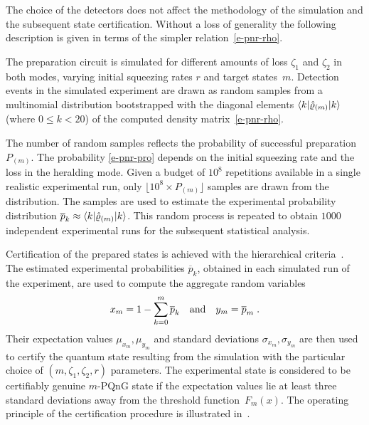 \documentclass{article}
\begin{document}
The choice of the detectors does not affect the methodology of the simulation and the subsequent state certification. Without a loss of generality the following description is given in terms of the simpler relation~\eqref{e-pnr-rho}.

The preparation circuit is simulated for different amounts of loss $\zeta_{1}$ and $\zeta_{2}$ in both modes, varying initial squeezing rates $r$ and target states~${m}$. Detection events in the simulated experiment are drawn as random samples from a multinomial distribution bootstrapped with the diagonal elements $\braket{k|\hat{\varrho}_{(m)}|k}$ (where $0 \leq k < 20$) of the computed density matrix~\eqref{e-pnr-rho}. 

The number of random samples reflects the probability of successful preparation $P_{(m)}$. The probability \eqref{e-pnr-pro} depends on the initial squeezing rate and the loss in the heralding mode. Given a budget of $10^{8}$ repetitions available in a single realistic experimental run, only ${\lfloor 10^{8} \times P_{(m)} \rfloor}$ samples are drawn from the distribution. The samples are used to estimate the experimental probability distribution ${\overline{p}_{k} \approx \braket{k|\hat{\varrho}_{(m)}|k}}$. This random process is repeated to obtain $1000$ independent experimental runs for the subsequent statistical analysis.

Certification of the prepared states is achieved with the hierarchical criteria~\cite{lachman2019}. 
%
The estimated experimental probabilities $\overline{p}_{k}$, obtained in each simulated run of the experiment, are used to compute the aggregate random variables
%
\begin{equation}
  x_{m} = 1 - \sum_{k = 0}^{m} \overline{p}_{k} 
  \quad\text{and}\quad
  y_{m} = \overline{p}_{m} 
  \;\text{.}
\end{equation}
%
Their expectation values $\mu_{x_{m}}, \mu_{y_{m}}$ and standard deviations $\sigma_{x_{m}}, \sigma_{y_{m}}$ are then used to certify the quantum state resulting from the simulation with the particular choice of $(m, \zeta_{1}, \zeta_{2}, r)$ parameters. The experimental state is considered to be certifiably genuine $m$-PQnG state if the expectation values lie at least three standard deviations away from the threshold function~$F_{m} (x)$. The operating principle of the certification procedure is illustrated in~.

%
\end{document}
